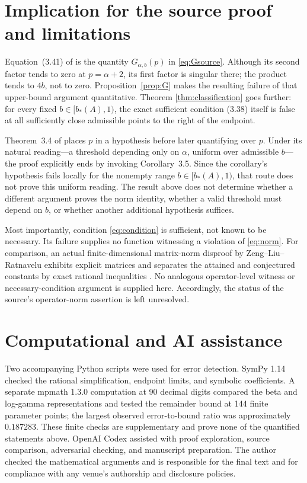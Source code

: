 \documentclass[11pt]{article}
\theoremstyle{remark}
\begin{document}
\section{Implication for the source proof and limitations}

Equation~(3.41) of \cite{li2026norm} is the quantity
$G_{\alpha,b}(p)$ in \eqref{eq:Gsource}.  Although its second factor tends
to zero at $p=\alpha+2$, its first factor is singular there; the product
tends to $4b$, not to zero.  Proposition~\ref{prop:G} makes the resulting
failure of that upper-bound argument quantitative.  Theorem
\ref{thm:classification} goes further: for every fixed
$b\in[b_*(A),1)$, the exact sufficient condition (3.38) itself is false at
all sufficiently close admissible points to the right of the endpoint.

Theorem~3.4 of \cite{li2026norm} places $p$ in a hypothesis before later
quantifying over $p$.  Under its natural reading---a threshold depending
only on $\alpha$, uniform over admissible $b$---the proof explicitly ends
by invoking Corollary~3.5.  Since the corollary's hypothesis fails locally
for the nonempty range $b\in[b_*(A),1)$, that route does not prove this
uniform reading.  The result above does not determine whether a different
argument proves the norm identity, whether a valid threshold must depend on
$b$, or whether another additional hypothesis suffices.

Most importantly, condition \eqref{eq:condition} is sufficient, not known
to be necessary.  Its failure supplies no function witnessing a violation
of \eqref{eq:norm}.  For comparison, an actual finite-dimensional
matrix-norm disproof by Zeng--Liu--Ratnavelu exhibits explicit matrices
and separates the attained and conjectured constants by exact rational
inequalities \cite{zeng2026counterexample}.  No analogous operator-level
witness or necessary-condition argument is supplied here.  Accordingly,
the status of the source's operator-norm assertion is left unresolved.

\section*{Computational and AI assistance}

Two accompanying Python scripts were used for error detection.  SymPy
1.14 \cite{meurer2017sympy} checked the rational simplification, endpoint
limits, and symbolic coefficients.  A separate mpmath 1.3.0 computation at
90 decimal digits compared the beta and log-gamma representations and
tested the remainder bound at 144 finite parameter points; the largest
observed error-to-bound ratio was approximately $0.187283$.  These finite
checks are supplementary and prove none of the quantified statements above.
OpenAI Codex assisted with proof exploration, source comparison, adversarial
checking, and manuscript preparation.  The author checked the mathematical
arguments and is responsible for the final text and for compliance with any
venue's authorship and disclosure policies.



\end{document}
